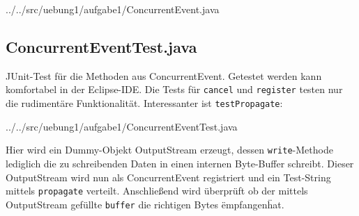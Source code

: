 
{../../src/uebung1/aufgabe1/ConcurrentEvent.java}

\subsection*{ConcurrentEventTest.java}

JUnit-Test für die Methoden aus ConcurrentEvent. Getestet werden kann komfortabel in der Eclipse-IDE. Die Tests für {\tt cancel} und {\tt register} testen nur die rudimentäre Funktionalität. Interessanter ist {\tt testPropagate}:


{../../src/uebung1/aufgabe1/ConcurrentEventTest.java}

Hier wird ein Dummy-Objekt OutputStream erzeugt, dessen {\tt write}-Methode lediglich die zu schreibenden Daten in einen internen Byte-Buffer schreibt. Dieser OutputStream wird nun als ConcurrentEvent registriert und ein Test-String mittels {\tt propagate} verteilt. Anschließend wird überprüft ob der mittels OutputStream gefüllte {\tt buffer} die richtigen Bytes \"empfangen\" hat.
